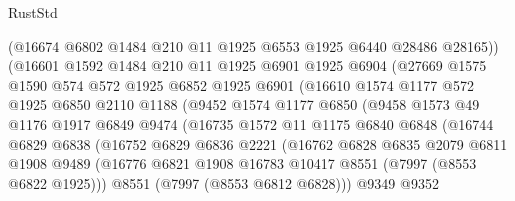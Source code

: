 \begin{lexlean}{RustStd}
\begin{coremodule}
                      (@16674 @6802 @1484 @210 @11 @1925 @6553 @1925 @6440 @28486 @28165))
                    (@16601
                      @1592
                      @1484
                      @210
                      @11
                      @1925
                      @6901
                      @1925
                      @6904
                      (@27669
                        @1575
                        @1590
                        @574
                        @572
                        @1925
                        @6852
                        @1925
                        @6901
                        (@16610
                          @1574
                          @1177
                          @572
                          @1925
                          @6850
                          @2110
                          @1188
                          (@9452
                            @1574
                            @1177
                            @6850
                            (@9458
                              @1573
                              @49
                              @1176
                              @1917
                              @6849
                              @9474
                              (@16735
                                @1572
                                @11
                                @1175
                                @6840
                                @6848
                                (@16744
                                  @6829
                                  @6838
                                  (@16752
                                    @6829
                                    @6836
                                    @2221
                                    (@16762
                                      @6828
                                      @6835
                                      @2079
                                      @6811
                                      @1908
                                      @9489
                                      (@16776
                                        @6821
                                        @1908
                                        @16783
                                        @10417
                                        @8551
                                        (@7997 (@8553 @6822 @1925)))
                                      @8551
                                      (@7997 (@8553 @6812 @6828)))
                                    @9349
                                    @9352

\end{coremodule}
\end{lexlean}
